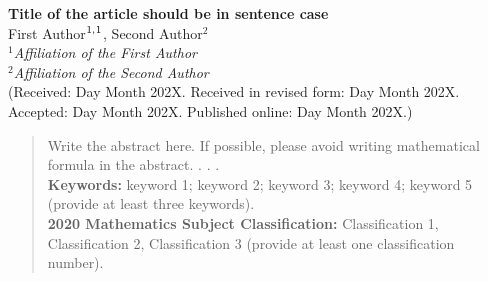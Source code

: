 \documentclass[10pt,a4paper]{article}
\begin{document}
\baselineskip=0.20in




\vskip36pt


\noindent
{\large \bf Title of the article should be in sentence case}\\




\noindent
First Author$^{1,}\footnote{Corresponding author (xyz1@example.com)}$, Second Author$^{2}$\\

\noindent
\footnotesize $^1${\it Affiliation of the First Author}\\
\noindent
 $^2${\it Affiliation of the Second Author\/} \\




\noindent
 (\footnotesize Received: Day Month 202X. Received in revised form: Day Month 202X. Accepted: Day Month 202X. Published online: Day Month 202X.)\\


\setcounter{page}{1} \thispagestyle{empty}


\baselineskip=0.20in


\normalsize

 \begin{abstract}
 \noindent
 Write the abstract here.  If possible, please avoid writing mathematical formula in the abstract. 
 .
 .
 .
 \\[2mm]
 {\bf Keywords:} keyword 1; keyword 2; keyword 3; keyword 4; keyword 5 (provide at least three keywords).\\[2mm]
 {\bf 2020 Mathematics Subject Classification:} Classification 1, Classification 2, Classification 3 (provide at least one classification number).
 \end{abstract}

\baselineskip=0.20in
\end{document}
